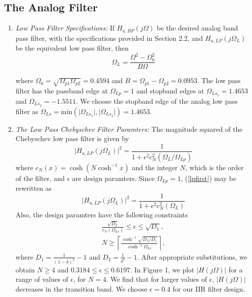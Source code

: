 \documentclass{article}
\begin{document}
\subsection{The Analog Filter}
\begin{enumerate}

\item {\em Low Pass Filter Specifications:}  If $H_{a, BP}(j\Omega)$ be the desired analog band
pass filter,  with the specifications provided in Section 2.2, and $H_{a,LP}(j\Omega_L)$ 
be the equivalent low pass filter, then
\begin{equation}
\label{transition}
\Omega_L = \frac{\Omega^2 - \Omega_0^2}{B\Omega}
\end{equation}

where $\Omega_0 = \sqrt{\Omega_{p1}\Omega_{p2}} = 0.4594$ and $B = \Omega_{p1} - \Omega_{p2} = 0.0953$.  The low pass filter has
the passband edge at $\Omega_{Lp} = 1$ and stopband edges at $\Omega_{Ls_1} = 1.4653$ and $\Omega_{Ls_2} = -1.5511$.  We choose the stopband edge of the analog low pass filter as $\Omega_{Ls} = \mbox{min}(\vert \Omega_{Ls_1}\vert,\vert \Omega_{Ls_2}\vert) = 1.4653$.

\item {\em The Low Pass Chebyschev Filter Paramters:}  The magnitude squared of the Chebyschev low pass filter is given by 
\begin{equation}
\label{lpfirst}
\vert H_{a,LP}(j\Omega_L)\vert^2 = \frac{1}{1 + \epsilon^2c_N^2(\Omega_L/\Omega_{Lp})}
\end{equation}
where $c_N(x) = \cosh(N \cosh^{-1}x)$ and the integer $N$, which is the order of the filter, and $\epsilon$ are design paramters.  Since $\Omega_{Lp} = 1$, (\ref{lpfirst}) may be rewritten as
\begin{equation}
\label{lpsecond}
\vert H_{a,LP}(j\Omega_L)\vert^2 = \frac{1}{1 + \epsilon^2c_N^2(\Omega_L)}
\end{equation}
Also, the design paramters have the following constraints
\begin{eqnarray}
\label{lpdesign}
\frac{\sqrt{D_2}}{c_N(\Omega_{Ls})} \leq \epsilon \leq \sqrt{D_1}, \nonumber \\
N \geq \left\lceil \frac{\cosh^{-1}\sqrt{D_2/D_1}}{\cosh^{-1}\Omega_{Ls}} \right\rceil,
\end{eqnarray}
where $D_1 = \frac{1}{(1 - \delta)^2}-1$ and $D_2 = \frac{1}{\delta^2} - 1$.  After appropriate substitutions,
we obtain $N \geq 4$ and $0.3184 \leq \epsilon \leq 0.6197$.  In Figure 1, we plot $\vert H(j\Omega)\vert$ for a range of values of $\epsilon$, for $N = 4$.  We find that for larger values of $\epsilon$, $|H(j\Omega)|$ decreases in the transition band.  We choose $\epsilon = 0.4$  for our IIR filter design.  


\end{enumerate}
\end{document}
